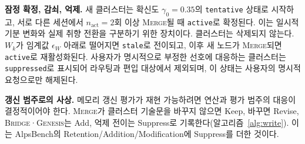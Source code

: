 \documentclass[10pt,twocolumn,letterpaper]{article}
\begin{document}
\textbf{잠정 확정, 감쇠, 억제.} 새 클러스터는 확신도 $\gamma_0=0.35$의 \texttt{tentative} 상태로 시작하고, 서로 다른 세션에서 $n_{\mathrm{act}}=2$회 이상 \textsc{Merge}될 때 \texttt{active}로 확정된다. 이는 일시적 기분 변화와 실제 취향 전환을 구분하기 위한 장치이다. 클러스터는 삭제되지 않는다. $W_k$가 임계값 $\epsilon_W$ 아래로 떨어지면 \texttt{stale}로 전이되고, 이후 새 노드가 \textsc{Merge}되면 \texttt{active}로 재활성화된다. 사용자가 명시적으로 부정한 선호에 대응하는 클러스터는 \texttt{suppressed}로 표시되어 라우팅과 편입 대상에서 제외되며, 이 상태는 사용자의 명시적 요청으로만 해제된다.

\textbf{갱신 범주로의 사상.} 메모리 갱신 평가가 재현 가능하려면 연산과 평가 범주의 대응이 결정적이어야 한다. \textsc{Merge}가 클러스터 기술문을 바꾸지 않으면 Keep, 바꾸면 Revise, \textsc{Bridge}·\textsc{Genesis}는 Add, 억제 전이는 Suppress로 기록한다(알고리즘~\ref{alg:write}). 이는 AlpsBench의 Retention/Addition/Modification에 Suppress를 더한 것이다.
\end{document}
